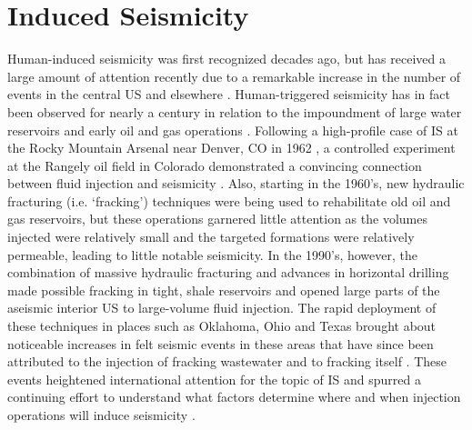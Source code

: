 \section{Induced Seismicity}\label{IS}
Human-induced seismicity was first recognized decades ago, but has received a large amount of attention recently due to a remarkable increase in the number of events in the central US and elsewhere \citep{Ellsworth_2013,Kim_2013,Keranen_2013,Kim_2013,Keranen_2013,Zoback_2012co2,Baisch_2006,Evans_2004,Deichmann_2009}. Human-triggered seismicity has in fact been observed for nearly a century in relation to the impoundment of large water reservoirs \citep[e.g.][]{carder1945seismic,Gupta_2018} and early oil and gas operations \citep{Hough_2016}. Following a high-profile case of IS at the Rocky Mountain Arsenal near Denver, CO in 1962 \citep{Healy_1968}, a controlled experiment at the Rangely oil field in Colorado demonstrated a convincing connection between fluid injection and seismicity \citep{Raleigh_1976}. Also, starting in the 1960's, new hydraulic fracturing (i.e. `fracking') techniques were being used to rehabilitate old oil and gas reservoirs, but these operations garnered little attention as the volumes injected were relatively small and the targeted formations were relatively permeable, leading to little notable seismicity. In the 1990's, however, the combination of massive hydraulic fracturing and advances in horizontal drilling made possible fracking in tight, shale reservoirs and opened large parts of the aseismic interior US to large-volume fluid injection. The rapid deployment of these techniques in places such as Oklahoma, Ohio and Texas brought about noticeable increases in felt seismic events in these areas \citep{Ellsworth_2013} that have since been attributed to the injection of fracking wastewater and to fracking itself \citep[e.g.][]{Kim_2013,Keranen_2013,Kim_2013,Keranen_2013}.  These events heightened international attention for the topic of IS and spurred a continuing effort to understand what factors determine where and when injection operations will induce seismicity \citep[e.g.][]{Goebel_2018}.

